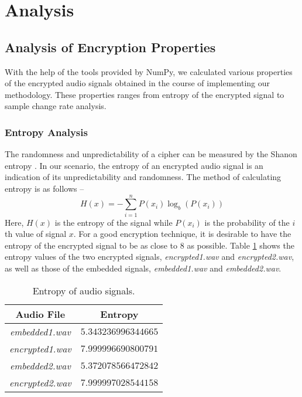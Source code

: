 \documentclass{article}
\begin{document}
\section{Analysis}
\label{sec:analysis}
\subsection{Analysis of Encryption Properties}
With the help of the tools provided by NumPy, we calculated various properties of the encrypted audio signals obtained in the course of implementing our methodology. These properties ranges from entropy of the encrypted signal to sample change rate analysis.
\subsubsection{Entropy Analysis}
The randomness and unpredictability of a cipher can be measured by the Shanon entropy \cite{shannon1948mathematical}. In our scenario, the entropy of an encrypted audio signal is an indication of its unpredictability and randomness. The method of calculating entropy is as follows --
\[H(x)=-\sum_{i=1}^{n}P(x_i)\log_{b}(P(x_i))\]
Here, $H(x)$ is the entropy of the signal while $P(x_i)$ is the probability of the $i$th value of signal $x$. For a good encryption technique, it is desirable to have the entropy of the encrypted signal to be as close to $8$ as possible. Table \ref{table:entropy} shows the entropy values of the two encrypted signals, \textit{encrypted1.wav} and \textit{encrypted2.wav}, as well as those of the embedded signals, \textit{embedded1.wav} and \textit{embedded2.wav}.
\begin{table}[!h]
    \begin{center}
        \caption{Entropy of audio signals.}
        \begin{tabular}{cc}
            \hline
            Audio File              & Entropy             \\ \hline
            \textit{embedded1.wav}  & $5.343236996344665$ \\
            \textit{encrypted1.wav} & $7.999996690800791$ \\ \hdashline
            \textit{embedded2.wav}  & $5.372078566472842$ \\
            \textit{encrypted2.wav} & $7.999997028544158$ \\ \hline
        \end{tabular}
        \label{table:entropy}
    \end{center}
\end{table}
\end{document}
